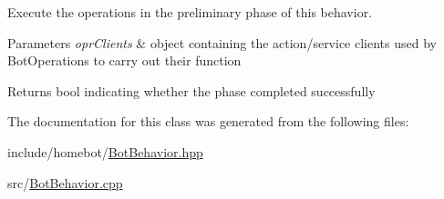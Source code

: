 Execute the operations in the preliminary phase of this behavior. 


\begin{DoxyParams}{Parameters}
{\em opr\-Clients} & object containing the action/service clients used by Bot\-Operations to carry out their function \\
\hline
\end{DoxyParams}
\begin{DoxyReturn}{Returns}
bool indicating whether the phase completed successfully 
\end{DoxyReturn}


The documentation for this class was generated from the following files\-:\begin{DoxyCompactItemize}
\item 
include/homebot/\hyperlink{BotBehavior_8hpp}{Bot\-Behavior.\-hpp}\item 
src/\hyperlink{BotBehavior_8cpp}{Bot\-Behavior.\-cpp}\end{DoxyCompactItemize}
